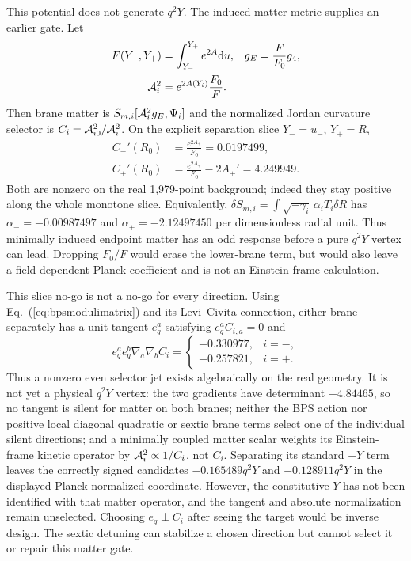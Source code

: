 \documentclass[10pt]{article}
\newcommand{\dd}{\mathrm{d}}
\begin{document}
This potential does not generate $q^2Y$.  The induced matter metric supplies
an earlier gate.  Let
\begin{equation}
 \begin{aligned}
 F(Y_-,Y_+)&=\int_{Y_-}^{Y_+}e^{2A}\dd u,&
 g_E&=\frac{F}{F_0}g_4,\\
 {\cal A}_i^2&=e^{2A(Y_i)}\frac{F_0}{F}.&&
 \end{aligned}
 \label{eq:bpsmattermetric}
\end{equation}
Then brane matter is $S_{m,i}[{\cal A}_i^2g_E,\Psi_i]$ and the normalized
Jordan curvature selector is $C_i={\cal A}_{i0}^2/{\cal A}_i^2$.  On the
explicit separation slice $Y_-=u_-$, $Y_+=R$,
\begin{equation}
 \begin{aligned}
 C_-'(R_0)&=\frac{e^{2A_+}}{F_0}=0.0197499,\\
 C_+'(R_0)&=\frac{e^{2A_+}}{F_0}-2A_+'=4.249949 .
 \end{aligned}
 \label{eq:bpsmatterodd}
\end{equation}
Both are nonzero on the real 1,979-point background; indeed they stay positive
along the whole monotone slice.  Equivalently,
$\delta S_{m,i}=\int\sqrt{-\gamma_i}\,\alpha_iT_i\delta R$ has
$\alpha_-= -0.00987497$ and $\alpha_+=-2.12497450$ per dimensionless radial
unit.  Thus minimally induced endpoint matter has an odd response before a
pure $q^2Y$ vertex can lead.  Dropping $F_0/F$ would erase the lower-brane
term, but would also leave a field-dependent Planck coefficient and is not an
Einstein-frame calculation.

This slice no-go is not a no-go for every direction.  Using
Eq.~(\ref{eq:bpsmodulimatrix}) and its Levi--Civita connection, either brane
separately has a unit tangent $e_q^a$ satisfying $e_q^aC_{i,a}=0$ and
\begin{equation}
 e_q^ae_q^b\nabla_a\nabla_bC_i=
 \begin{cases}-0.330977,&i=-,\\-0.257821,&i=+ .\end{cases}
 \label{eq:bpscovariantmatterjets}
\end{equation}
Thus a nonzero even selector jet exists algebraically on the real geometry.
It is not yet a physical $q^2Y$ vertex: the two gradients have determinant
$-4.84465$, so no tangent is silent for matter on both branes; neither the BPS
action nor positive local diagonal quadratic or sextic brane terms select one
of the individual silent directions; and a minimally coupled matter scalar
weights its Einstein-frame kinetic operator by ${\cal A}_i^2\propto1/C_i$,
not $C_i$.  Separating its standard $-Y$ term leaves the correctly signed
candidates $-0.165489q^2Y$ and $-0.128911q^2Y$ in the displayed
Planck-normalized coordinate.  However, the constitutive $Y$ has not been
identified with that matter operator, and the tangent and absolute
normalization remain unselected.  Choosing $e_q\perp C_i$ after seeing the
target would be inverse design.  The sextic detuning can stabilize a chosen
direction but cannot select it or repair this matter gate.
\end{document}
